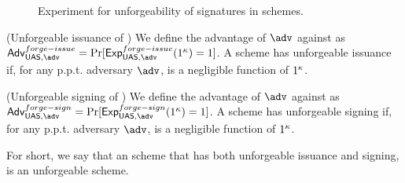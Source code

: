 \begin{figure}[htp!]
  \caption{Experiment for unforgeability of signatures in \UAS schemes.}
  \label{fig:exp-uas-unfor-sign}
\end{figure}

\begin{definition}{(Unforgeable issuance of \UAS)}
  We define the advantage \AdvForgeIssue of $\adv$ against \ExpForgeIssue as
  $\AdvForgeIssue=\Pr\lbrack\ExpForgeIssue(1^\secpar)=1\rbrack$.
  A \UAS scheme has unforgeable issuance if, for any p.p.t. adversary $\adv$,
  \AdvForgeIssue is a negligible function of $1^\kappa$.
\end{definition}

\begin{definition}{(Unforgeable signing of \UAS)}
  We define the advantage \AdvForgeSign of $\adv$ against \ExpForgeSign as
  $\AdvForgeSign=\Pr\lbrack\ExpForgeSign(1^\secpar)=1\rbrack$.
  A \UAS scheme has unforgeable signing if, for any p.p.t. adversary $\adv$,
  \AdvForgeSign is a negligible function of $1^\kappa$.
\end{definition}

For short, we say that an \UAS scheme that has both unforgeable issuance and
signing, is an unforgeable \UAS scheme.

